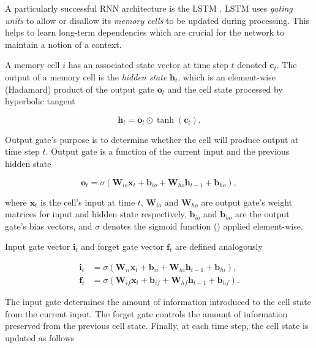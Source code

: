 A particularly successful \ac{RNN} architecture is the \ac{LSTM} \cite{Hochreiter1997}. \ac{LSTM} uses \emph{gating units} to allow or disallow its \emph{memory cells} to be updated during processing. This helps to learn long-term dependencies which are crucial for the network to maintain a notion of a context.

A memory cell $i$ has an associated state vector at time step $t$ denoted $\pmb{c}_t$. The output of a memory cell is the \emph{hidden state} $\pmb{h}_t$, which is an element-wise (Hadamard) product of the output gate $\pmb{o}_t$ and the cell state processed by hyperbolic tangent

\begin{equation}
  \pmb{h}_t = \pmb{o}_t \odot \tanh (\pmb{c}_t).
  \label{eq:lstm_hidden_state}
\end{equation}

Output gate's purpose is to determine whether the cell will produce output at time step $t$. Output gate is a function of the current input and the previous hidden state

\begin{equation}
  \pmb{o}_t = \sigma (\pmb{W}_{io} \pmb{x}_t + \pmb{b}_{io} + \pmb{W}_{ho} \pmb{h}_{t-1} + \pmb{b}_{ho}),
  \label{eq:lstm_output_gate}
\end{equation}

where $\pmb{x}_t$ is the cell's input at time $t$, $\pmb{W}_{io}$ and $\pmb{W}_{ho}$ are output gate's weight matrices for input and hidden state respectively, $\pmb{b}_{io}$ and $\pmb{b}_{ho}$ are the output gate's bias vectors, and $\sigma$ denotes the sigmoid function () applied element-wise.

Input gate vector $\pmb{i}_t$ and forget gate vector $\pmb{f}_t$ are defined analogously

\begin{align}
  \pmb{i}_t &= \sigma (\pmb{W}_{ii} \pmb{x}_t + \pmb{b}_{ii} + \pmb{W}_{hi} \pmb{h}_{t-1} + \pmb{b}_{hi}), \label{eq:lstm_input_gate}\\
  \pmb{f}_t &= \sigma (\pmb{W}_{if} \pmb{x}_t + \pmb{b}_{if} + \pmb{W}_{hf} \pmb{h}_{t-1} + \pmb{b}_{hf}). \label{eq:lstm_forget_gate}
\end{align}

The input gate determines the amount of information introduced to the cell state from the current input. The forget gate controls the amount of information preserved from the previous cell state. Finally, at each time step, the cell state is updated as follows


